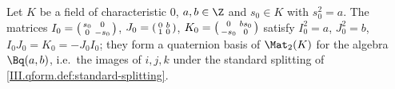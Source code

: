 Let $K$ be a field of characteristic $0$, $a,b\in\Z$ and $s_0\in K$ with $s_0^2=a$. The matrices
$I_0=\begin{psmallmatrix}s_0&0\\0&-s_0\end{psmallmatrix}$, $J_0=\begin{psmallmatrix}0&b\\1&0\end{psmallmatrix}$, $K_0=\begin{psmallmatrix}0&bs_0\\-s_0&0\end{psmallmatrix}$ satisfy
$I_0^2=a$, $J_0^2=b$, $I_0J_0=K_0=-J_0I_0$; they form a quaternion basis of $\Mat_2(K)$ for the algebra $\Bq(a,b)$, i.e.\ the images of $i,j,k$ under the standard splitting of \cref{III.qform.def:standard-splitting}.

